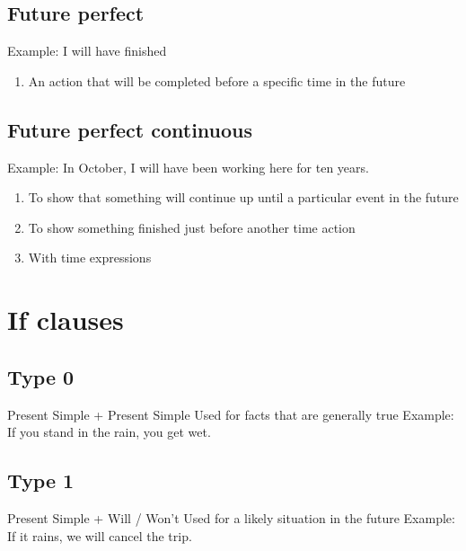 \documentclass{article}
\begin{document}
    \subsection{Future perfect}

    Example: I will have finished

    \begin{enumerate}
        \item An action that will be completed before a specific time in the future
    \end{enumerate}

    \subsection{Future perfect continuous}

    Example: In October, I will have been working here for ten years.

    \begin{enumerate}
        \item To show that something will continue up until a particular event in the future
        \item To show something finished just before another time action
        \item With time expressions
    \end{enumerate}

    \section{If clauses}

    \subsection{Type 0}

    Present Simple + Present Simple
    \newline
    Used for facts that are generally true
    \newline
    Example: If you stand in the rain, you get wet.

    \subsection{Type 1}

    Present Simple + Will / Won't
    \newline
    Used for a likely situation in the future
    \newline
    Example: If it rains, we will cancel the trip.
\end{document}
